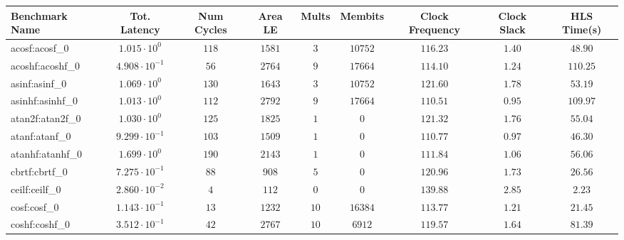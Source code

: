 \begin{tabular}{|l|c|c|c|c|c|c|c|c|}
\hline
Benchmark Name               & Tot. Latency            & Num Cycles & Area LE   & Mults   & Membits    & Clock Frequency & Clock Slack & HLS Time(s) \\
\hline
acosf:acosf\_0               & $ 1.015 \cdot 10^{0}  $ & $ 118    $ & $ 1581  $ & $ 3   $ & $ 10752  $ & $ 116.23      $ & $ 1.40    $ & $ 48.90   $ \\
acoshf:acoshf\_0             & $ 4.908 \cdot 10^{-1} $ & $ 56     $ & $ 2764  $ & $ 9   $ & $ 17664  $ & $ 114.10      $ & $ 1.24    $ & $ 110.25  $ \\
asinf:asinf\_0               & $ 1.069 \cdot 10^{0}  $ & $ 130    $ & $ 1643  $ & $ 3   $ & $ 10752  $ & $ 121.60      $ & $ 1.78    $ & $ 53.19   $ \\
asinhf:asinhf\_0             & $ 1.013 \cdot 10^{0}  $ & $ 112    $ & $ 2792  $ & $ 9   $ & $ 17664  $ & $ 110.51      $ & $ 0.95    $ & $ 109.97  $ \\
atan2f:atan2f\_0             & $ 1.030 \cdot 10^{0}  $ & $ 125    $ & $ 1825  $ & $ 1   $ & $ 0      $ & $ 121.32      $ & $ 1.76    $ & $ 55.04   $ \\
atanf:atanf\_0               & $ 9.299 \cdot 10^{-1} $ & $ 103    $ & $ 1509  $ & $ 1   $ & $ 0      $ & $ 110.77      $ & $ 0.97    $ & $ 46.30   $ \\
atanhf:atanhf\_0             & $ 1.699 \cdot 10^{0}  $ & $ 190    $ & $ 2143  $ & $ 1   $ & $ 0      $ & $ 111.84      $ & $ 1.06    $ & $ 56.06   $ \\
cbrtf:cbrtf\_0               & $ 7.275 \cdot 10^{-1} $ & $ 88     $ & $ 908   $ & $ 5   $ & $ 0      $ & $ 120.96      $ & $ 1.73    $ & $ 26.56   $ \\
ceilf:ceilf\_0               & $ 2.860 \cdot 10^{-2} $ & $ 4      $ & $ 112   $ & $ 0   $ & $ 0      $ & $ 139.88      $ & $ 2.85    $ & $ 2.23    $ \\
cosf:cosf\_0                 & $ 1.143 \cdot 10^{-1} $ & $ 13     $ & $ 1232  $ & $ 10  $ & $ 16384  $ & $ 113.77      $ & $ 1.21    $ & $ 21.45   $ \\
coshf:coshf\_0               & $ 3.512 \cdot 10^{-1} $ & $ 42     $ & $ 2767  $ & $ 10  $ & $ 6912   $ & $ 119.57      $ & $ 1.64    $ & $ 81.39   $ \\

\end{tabular}
